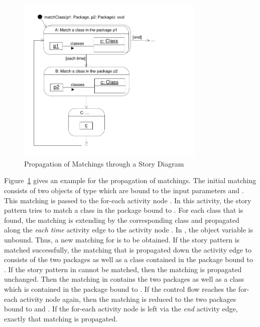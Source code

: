 \begin{figure}[htbp]
\begin{center}
  \includegraphics[width=0.8\textwidth]{figures/PropagationOfMatchingsExample}
  \caption{Propagation of Matchings through a Story Diagram}
  \label{fig:propagation}
\end{center}
\end{figure}

Figure~\ref{fig:propagation} gives an example for the propagation of matchings. The initial matching consists of two objects of type  which are bound to the input parameters  and . This matching is passed to the for-each activity node . In this activity, the story pattern tries to match a class in the package bound to . For each class that is found, the matching is extending by the corresponding class and propagated along the \emph{each time} activity edge to the activity node . In , the object variable  is unbound. Thus, a new matching for  is to be obtained. If the story pattern is matched successfully, the matching that is propagated down the activity edge to  consists of the two packages as well as a class contained in the package bound to . If the story pattern in  cannot be matched, then the matching is propagated unchanged. Then the matching in  contains the two packages as well as a class which is contained in the package bound to . If the control flow reaches the for-each activity node  again, then the matching is reduced to the two packages bound to  and . If the for-each activity node  is left via the \emph{end} activity edge, exactly that matching is propagated.

